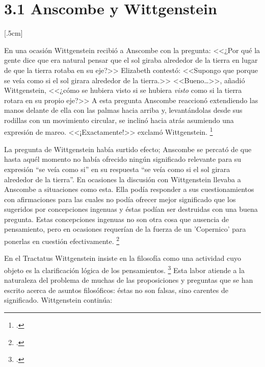 \section{3.1 Anscombe y Wittgenstein}

[.5cm]


En una ocasión Wittgenstein recibió a Anscombe con la pregunta: <<¿Por qué la
gente dice que era natural pensar que el sol giraba alrededor de la tierra en
lugar de que la tierra rotaba en su eje?>> Elizabeth contestó: <<Supongo que
porque se veía como si el sol girara alrededor de la tierra.>> <<Bueno\ldots>>,
añadió Wittgenstein, <<¿cómo se hubiera visto si se hubiera \emph{visto} como si
la tierra rotara en su propio eje?>> A esta pregunta Anscombe reaccionó
extendiendo las manos delante de ella con las palmas hacia arriba y,
levantándolas desde sus rodillas con un movimiento circular, se inclinó hacia
atrás asumiendo una expresión de mareo. <<¡Exactamente!>> exclamó Wittgenstein.
\footcite[151]{IWT}


La pregunta de Wittgenstein había surtido efecto; Anscombe se percató de que
hasta aquél momento no había ofrecido ningún significado relevante para su
expresión ``se veía como si'' en su respuesta ``se veía como si el sol girara
alrededor de la tierra''. En ocasiones la discusión con Wittgenstein llevaba a
Anscombe a situaciones como esta. Ella podía responder a sus cuestionamientos
con afirmaciones para las cuales no podía ofrecer mejor significado que los
sugeridos por concepciones ingenuas y éstas podían ser destruidas con una buena
pregunta. Estas concepciones ingenuas no son otra cosa que ausencia de
pensamiento, pero en ocasiones requerían de la fuerza de un 'Copernico' para
ponerlas en cuestión efectivamente.  \footcite[cf. 151]{IWT}



En el Tractatus Wittgenstein insiste en la filosofía como una actividad cuyo
objeto es la clarificación lógica de los pensamientos. \footcite[4.112 p.
52]{tractatus} Esta labor atiende a la naturaleza del problema de muchas de las
proposiciones y preguntas que se han escrito acerca de asuntos filosóficos:
éstas no son falsas, sino carentes de significado. Wittgenstein continúa:


